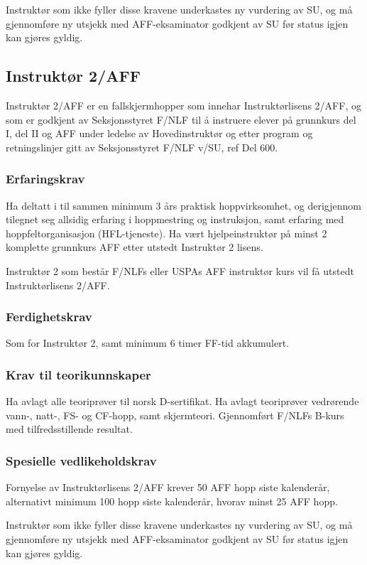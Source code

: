 Instruktør som ikke fyller disse kravene underkastes ny vurdering av SU, og må gjennomføre ny utsjekk med AFF-eksaminator godkjent av SU før status igjen kan gjøres gyldig.

\subsection{Instruktør 2/AFF}
Instruktør 2/AFF er en fallskjermhopper som innehar Instruktørlisens 2/AFF, og som er godkjent av Seksjonsstyret F/NLF til å instruere elever på grunnkurs del I, del II og AFF under ledelse av Hovedinstruktør og etter program og retningslinjer gitt av Seksjonsstyret F/NLF v/SU, ref Del 600.

\subsubsection{Erfaringskrav}
Ha deltatt i til sammen minimum 3 års praktisk hoppvirksomhet, og derigjennom tilegnet seg allsidig erfaring i hoppmestring og instruksjon, samt erfaring med hoppfeltorganisasjon (HFL-tjeneste). Ha vært hjelpeinstruktør på minst 2 komplette grunnkurs AFF etter utstedt Instruktør 2 lisens.

Instruktør 2 som består F/NLFs eller USPAs AFF instruktør kurs vil få utstedt Instruktørlisens 2/AFF.

\subsubsection{Ferdighetskrav}
Som for Instruktør 2, samt minimum 6 timer FF-tid akkumulert.

\subsubsection{Krav til teorikunnskaper}
Ha avlagt alle teoriprøver til norsk D-sertifikat. Ha avlagt teoriprøver vedrørende vann-, natt-, FS- og CF-hopp, samt skjermteori. Gjennomført F/NLFs B-kurs med tilfredsstillende resultat.

\subsubsection{Spesielle vedlikeholdskrav}
Fornyelse av Instruktørlisens 2/AFF krever 50 AFF hopp siste kalenderår, alternativt minimum 100 hopp siste kalenderår, hvorav minst 25 AFF hopp.

Instruktør som ikke fyller disse kravene underkastes ny vurdering av SU, og må gjennomføre ny utsjekk med AFF-eksaminator godkjent av SU før status igjen kan gjøres gyldig.

